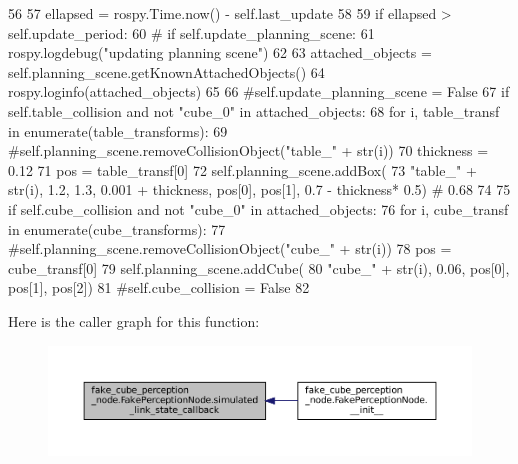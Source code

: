 \begin{DoxyCode}
56 
57         ellapsed = rospy.Time.now() - self.last\_update
58 
59         \textcolor{keywordflow}{if} ellapsed > self.update\_period:
60             \textcolor{comment}{# if self.update\_planning\_scene:}
61             rospy.logdebug(\textcolor{stringliteral}{"updating planning scene"})
62 
63             attached\_objects = self.planning\_scene.getKnownAttachedObjects()
64             rospy.loginfo(attached\_objects)
65 
66             \textcolor{comment}{#self.update\_planning\_scene = False}
67             \textcolor{keywordflow}{if} self.table\_collision \textcolor{keywordflow}{and} \textcolor{keywordflow}{not} \textcolor{stringliteral}{"cube\_0"} \textcolor{keywordflow}{in} attached\_objects:
68                 \textcolor{keywordflow}{for} i, table\_transf \textcolor{keywordflow}{in} enumerate(table\_transforms):
69                     \textcolor{comment}{#self.planning\_scene.removeCollisionObject("table\_" + str(i))}
70                     thickness = 0.12
71                     pos = table\_transf[0]
72                     self.planning\_scene.addBox(
73                         \textcolor{stringliteral}{"table\_"} + str(i), 1.2, 1.3, 0.001 + thickness, pos[0],  pos[1],  0.7 -  thickness*
      0.5)  \textcolor{comment}{# 0.68}
74 
75             \textcolor{keywordflow}{if} self.cube\_collision \textcolor{keywordflow}{and} \textcolor{keywordflow}{not} \textcolor{stringliteral}{"cube\_0"} \textcolor{keywordflow}{in} attached\_objects:
76                 \textcolor{keywordflow}{for} i, cube\_transf \textcolor{keywordflow}{in} enumerate(cube\_transforms):
77                     \textcolor{comment}{#self.planning\_scene.removeCollisionObject("cube\_" + str(i))}
78                     pos = cube\_transf[0]
79                     self.planning\_scene.addCube(
80                         \textcolor{stringliteral}{"cube\_"} + str(i), 0.06, pos[0],  pos[1],  pos[2])
81                     \textcolor{comment}{#self.cube\_collision = False}
82 
\end{DoxyCode}
Here is the caller graph for this function\+:
\nopagebreak
\begin{figure}[H]
\begin{center}
\leavevmode
\includegraphics[width=350pt]{classfake__cube__perception__node_1_1FakePerceptionNode_ac1127eae8d2eda994b22873529bd198f_icgraph}
\end{center}
\end{figure}
\mbox{\label{classfake__cube__perception__node_1_1FakePerceptionNode_ae73741e7f84f057cbf109698e70a2515}} 
